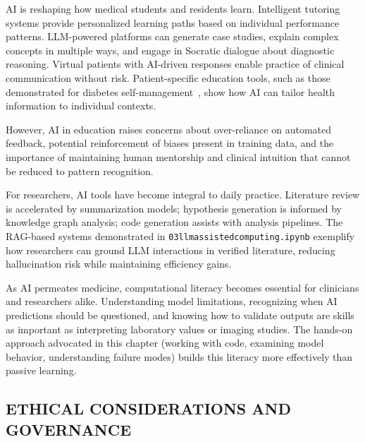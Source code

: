 \documentclass[krantz2,ChapterTOCs]{krantz}
\newcommand{\notebook}[1]{\texttt{\def\_{\textunderscore\allowbreak}#1}}
\begin{document}
\begin{description}[style=nextline, leftmargin=1em, labelindent=0pt, itemsep=0.2ex]
\item[Transforming medical education]
AI is reshaping how medical students and residents learn.
Intelligent tutoring systems provide personalized learning paths based on individual performance patterns.
LLM-powered platforms can generate case studies, explain complex concepts in multiple ways, and engage in Socratic dialogue about diagnostic reasoning.
Virtual patients with AI-driven responses enable practice of clinical communication without risk.
Patient-specific education tools, such as those demonstrated for diabetes self-management~\citep{skjervold2025diaguide}, show how AI can tailor health information to individual contexts.

However, AI in education raises concerns about over-reliance on automated feedback, potential reinforcement of biases present in training data, and the importance of maintaining human mentorship and clinical intuition that cannot be reduced to pattern recognition.

\item[Accelerating research workflows]
For researchers, AI tools have become integral to daily practice.
Literature review is accelerated by summarization models; hypothesis generation is informed by knowledge graph analysis; code generation assists with analysis pipelines.
The RAG-based systems demonstrated in \notebook{03\_llm\_assisted\_computing.ipynb} exemplify how researchers can ground LLM interactions in verified literature, reducing hallucination risk while maintaining efficiency gains.

\item[Computational literacy as core competency]
As AI permeates medicine, computational literacy becomes essential for clinicians and researchers alike.
Understanding model limitations, recognizing when AI predictions should be questioned, and knowing how to validate outputs are skills as important as interpreting laboratory values or imaging studies.
The hands-on approach advocated in this chapter (working with code, examining model behavior, understanding failure modes) builds this literacy more effectively than passive learning.
\end{description}

\subsection{ETHICAL CONSIDERATIONS AND GOVERNANCE}
\end{document}
